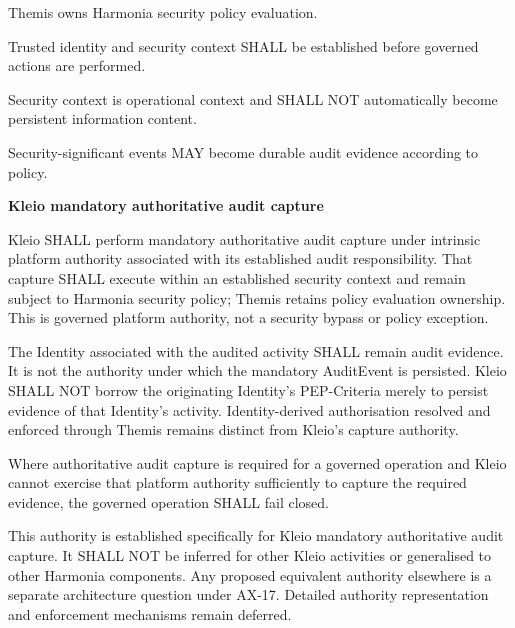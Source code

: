 Themis owns Harmonia security policy evaluation.



Trusted identity and security context SHALL be established before
governed actions are performed.



Security context is operational context and SHALL NOT automatically
become persistent information content.



Security-significant events MAY become durable audit evidence according
to policy.







\par\medskip\textbf{Kleio mandatory authoritative audit capture}\par


Kleio SHALL perform mandatory authoritative audit capture under intrinsic
platform authority associated with its established audit responsibility.
That capture SHALL execute within an established security context and remain
subject to Harmonia security policy; Themis retains policy evaluation ownership.
This is governed platform authority, not a security bypass or policy exception.



The Identity associated with the audited activity SHALL remain audit evidence.
It is not the authority under which the mandatory AuditEvent is persisted.
Kleio SHALL NOT borrow the originating Identity's PEP-Criteria merely to persist
evidence of that Identity's activity. Identity-derived authorisation resolved
and enforced through Themis remains distinct from Kleio's capture authority.



Where authoritative audit capture is required for a governed operation and
Kleio cannot exercise that platform authority sufficiently to capture the
required evidence, the governed operation SHALL fail closed.



This authority is established specifically for Kleio mandatory authoritative
audit capture. It SHALL NOT be inferred for other Kleio activities or generalised
to other Harmonia components. Any proposed equivalent authority elsewhere is
a separate architecture question under AX-17. Detailed authority representation
and enforcement mechanisms remain deferred.




